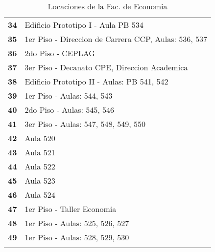 \begin{longtable}{ c  X }
\textbf{34}
&
Edificio Prototipo I - Aula PB 534
\\

\textbf{35}
&
1{\tiny er} Piso - Direccion de Carrera CCP, Aulas: 536, 537
\\


\textbf{36}
&
2{\tiny do} Piso - CEPLAG
\\

\textbf{37}
&
3{\tiny er} Piso - Decanato CPE, Direccion Academica
\\


\textbf{38}
&
Edificio Prototipo II - Aulas: PB 541, 542
\\

\textbf{39}
&
1{\tiny er} Piso - Aulas: 544, 543
\\


\textbf{40}
&
2{\tiny do} Piso - Aulas: 545, 546
\\


\textbf{41}
&
3{\tiny er} Piso - Aulas: 547, 548, 549, 550
\\


\textbf{42}
&
Aula 520
\\


\textbf{43}
&
Aula 521
\\


\textbf{44}
&
Aula 522
\\


\textbf{45}
&
Aula 523
\\


\textbf{46}
&
Aula 524
\\


\textbf{47}
&
1{\tiny er} Piso - Taller Economia
\\


\textbf{48}
&
1{\tiny er} Piso - Aulas: 525, 526, 527
\\


\textbf{49}
&
1{\tiny er} Piso - Aulas: 528, 529, 530
\\


      \bottomrule
      \caption{Locaciones de la Fac. de Economia}
      \label{tab:lugares_economia}
    \end{longtable}
